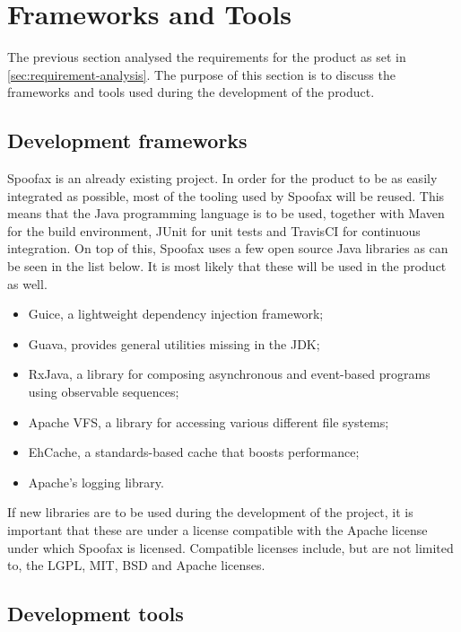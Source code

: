 \section{Frameworks and Tools}
\label{sec:realisation-product}

The previous section analysed the requirements for the product as set in
\cref{sec:requirement-analysis}. The purpose of this section is to discuss the
frameworks and tools used during the development of the product.

\subsection{Development frameworks}
\label{ssec:frameworks}

Spoofax is an already existing project. In order for the product to be as easily
integrated as possible, most of the tooling used by Spoofax will be reused. This
means that the Java programming language is to be used, together with Maven for
the build environment, JUnit for unit tests and TravisCI for continuous
integration. On top of this, Spoofax uses a few open source Java libraries as
can be seen in the list below. It is most likely that these will be used in the
product as well.

\begin{itemize}
  \item Guice, a lightweight dependency injection framework;
  \item Guava, provides general utilities missing in the JDK;
  \item RxJava, a library for composing asynchronous and event-based programs
    using observable sequences;
  \item Apache VFS, a library for accessing various different file systems;
  \item EhCache, a standards-based cache that boosts performance;
  \item Apache's logging library.
\end{itemize}

If new libraries are to be used during the development of the project, it is
important that these are under a license compatible with the Apache license
under which Spoofax is licensed. Compatible licenses include, but are not
limited to, the LGPL, MIT, BSD and Apache licenses.

\subsection{Development tools}
\label{ssec:tools}

